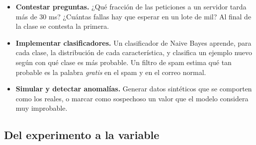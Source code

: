 \documentclass[11pt,letterpaper]{article}
\begin{document}
\begin{itemize}[itemsep=0.3em]
    \item \textbf{Contestar preguntas.} ¿Qué fracción de las peticiones
          a un servidor tarda más de $30$ ms? ¿Cuántas fallas hay que
          esperar en un lote de mil? Al final de la clase se contesta
          la primera.
    \item \textbf{Implementar clasificadores.} Un clasificador de Naive
          Bayes aprende, para cada clase, la distribución de cada
          característica, y clasifica un ejemplo nuevo según con qué
          clase es más probable. Un filtro de spam estima qué tan
          probable es la palabra \textit{gratis} en el spam y en el
          correo normal.
    \item \textbf{Simular y detectar anomalías.} Generar datos
          sintéticos que se comporten como los reales, o marcar como
          sospechoso un valor que el modelo considera muy improbable.
\end{itemize}


\subsection*{Del experimento a la variable}

\begin{center}
\end{center}
\end{document}
